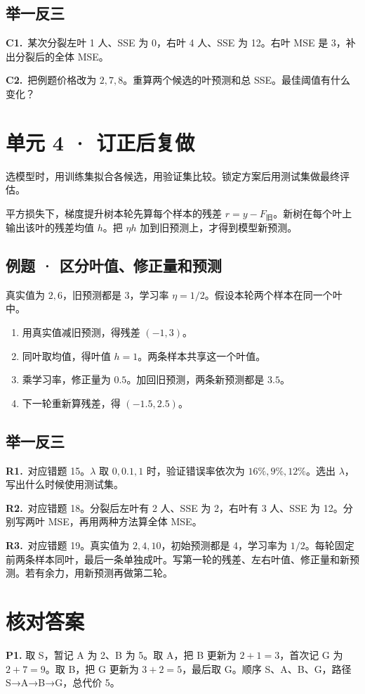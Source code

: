 \documentclass[UTF8,a4paper,11pt]{ctexart}
\newcommand{\CompactQuestion}[2]{\par\noindent\textbf{#1.}\ #2\par\vspace{.8em}}
\begin{document}
\subsection{举一反三}
\CompactQuestion{C1}{某次分裂左叶 1 人、SSE 为 0，右叶 4 人、SSE 为 12。右叶 MSE 是 3，补出分裂后的全体 MSE。}
\CompactQuestion{C2}{把例题价格改为 $2,7,8$。重算两个候选的叶预测和总 SSE。最佳阈值有什么变化？}
\clearpage
\section{单元 4 · 订正后复做}
选模型时，用训练集拟合各候选，用验证集比较。锁定方案后用测试集做最终评估。

平方损失下，梯度提升树本轮先算每个样本的残差 $r=y-F_{\text{旧}}$。新树在每个叶上输出该叶的残差均值 $h$。把 $\eta h$ 加到旧预测上，才得到模型新预测。

\subsection{例题 · 区分叶值、修正量和预测}
真实值为 $2,6$，旧预测都是 3，学习率 $\eta=1/2$。假设本轮两个样本在同一个叶中。

\begin{enumerate}
\item 用真实值减旧预测，得残差 $(-1,3)$。
\item 同叶取均值，得叶值 $h=1$。两条样本共享这一个叶值。
\item 乘学习率，修正量为 $0.5$。加回旧预测，两条新预测都是 $3.5$。
\item 下一轮重新算残差，得 $(-1.5,2.5)$。
\end{enumerate}
\subsection{举一反三}
\CompactQuestion{R1}{对应错题 15。$\lambda$ 取 $0,0.1,1$ 时，验证错误率依次为 $16\%,9\%,12\%$。选出 $\lambda$，写出什么时候使用测试集。}
\CompactQuestion{R2}{对应错题 18。分裂后左叶有 2 人、SSE 为 2，右叶有 3 人、SSE 为 12。分别写两叶 MSE，再用两种方法算全体 MSE。}
\CompactQuestion{R3}{对应错题 19。真实值为 $2,4,10$，初始预测都是 4，学习率为 $1/2$。每轮固定前两条样本同叶，最后一条单独成叶。写第一轮的残差、左右叶值、修正量和新预测。若有余力，用新预测再做第二轮。}
\clearpage
\section{核对答案}
\textbf{P1.} 取 S，暂记 A 为 2、B 为 5。取 A，把 B 更新为 $2+1=3$，首次记 G 为 $2+7=9$。取 B，把 G 更新为 $3+2=5$，最后取 G。顺序 S、A、B、G，路径 S→A→B→G，总代价 5。
\end{document}
